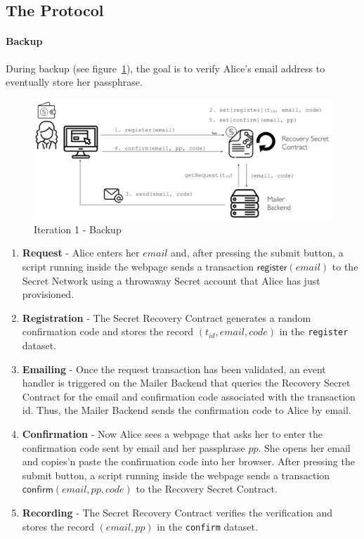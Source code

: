 \documentclass[12pt]{article}
\newcommand{\ms}[1]{\ensuremath{\mathsf{#1}}}
\begin{document}
\subsection{The Protocol}

\paragraph{Backup}

During backup (see figure~\ref{it1:backup}), the goal is to verify Alice's email address to eventually store her passphrase. 


\begin{figure}
  \includegraphics[width=\linewidth]{./media/media-001.png}
  \caption{Iteration 1 - Backup}
  \label{it1:backup}
\end{figure}

\begin{enumerate} 
\item {\bf Request} - Alice enters her $email$ and, after pressing the submit button, a script running inside the webpage sends a transaction {\bf $\ms{register}(email)$} to the Secret Network using a throwaway Secret account that Alice has just provisioned. 
\item {\bf Registration} - The Secret Recovery Contract generates a random confirmation code and stores the record $(t_{id}, email, code)$ in the {\tt register} dataset. 
\item {\bf Emailing} - Once the request transaction has been validated, an event handler is triggered on the Mailer Backend that queries the Recovery Secret Contract for the email and confirmation code associated with the transaction id. Thus, the Mailer Backend sends the confirmation code to Alice by email. 
\item {\bf Confirmation} - Now Alice sees a webpage that asks her to enter the confirmation code sent by email and her passphrase $pp$. She opens her email and copies'n paste the confirmation code into her browser. After pressing the submit button, a script running inside the webpage sends a transaction $\ms{confirm}(email, pp, code)$ to the Recovery Secret Contract. 
\item {\bf Recording} - The Secret Recovery Contract verifies the verification and stores the record $(email, pp)$ in the {\tt confirm} dataset. 
\end{enumerate}
\end{document}

